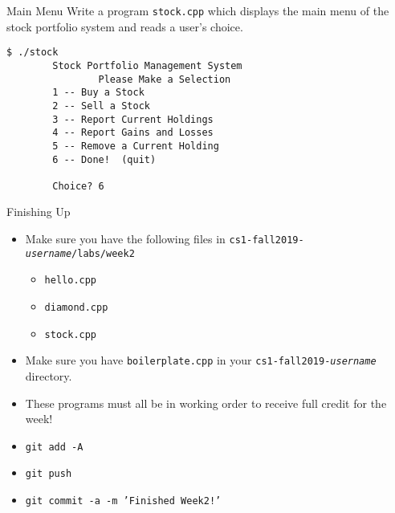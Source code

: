 \documentclass{beamer}
\begin{document}
\begin{frame}[fragile]{Main Menu}
Write a program \texttt{stock.cpp} which displays the main menu of the
stock portfolio system and reads a user's choice.  
\begin{verbatim}
$ ./stock
        Stock Portfolio Management System
                Please Make a Selection
        1 -- Buy a Stock
        2 -- Sell a Stock
        3 -- Report Current Holdings
        4 -- Report Gains and Losses
        5 -- Remove a Current Holding
        6 -- Done!  (quit) 

        Choice? 6
\end{verbatim}

\end{frame}

\begin{frame}{Finishing Up}
\begin{itemize}
    \item Make sure you have the following files in
        \texttt{cs1-fall2019-{\em username}/labs/week2}
        \begin{itemize}
            \item \texttt{hello.cpp}
            \item \texttt{diamond.cpp}
            \item \texttt{stock.cpp}
        \end{itemize}
    \item Make sure you have \texttt{boilerplate.cpp} in your
        \texttt{cs1-fall2019-{\em username}} directory.
    \item These programs must all be in working order to receive full
        credit for the week!
    \item \texttt{git add -A}
    \item \texttt{git push}
    \item \texttt{git commit -a -m 'Finished Week2!'}
\end{itemize}
\end{frame}
\end{document}
